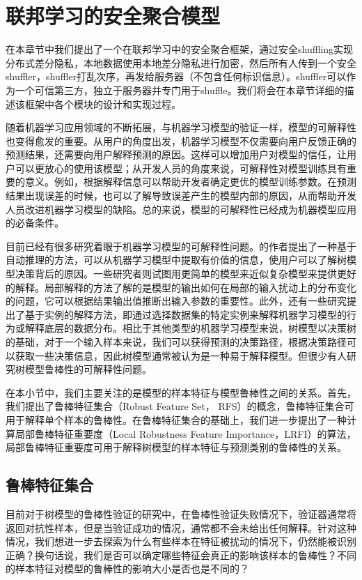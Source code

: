 \chapter{联邦学习的安全聚合模型}
\label{ch4}
在本章节中我们提出了一个在联邦学习中的安全聚合框架，通过安全shuffling实现分布式差分隐私，本地数据使用本地差分隐私进行加密，然后所有人传到一个安全shuffler，shuffler打乱次序，再发给服务器（不包含任何标识信息）。shuffler可以作为一个可信第三方，独立于服务器并专门用于shuffle。我们将会在本章节详细的描述该框架中各个模块的设计和实现过程。




随着机器学习应用领域的不断拓展，与机器学习模型的验证一样，模型的可解释性也变得愈发的重要。从用户的角度出发，机器学习模型不仅需要向用户反馈正确的预测结果，还需要向用户解释预测的原因。这样可以增加用户对模型的信任，让用户可以更放心的使用该模型；从开发人员的角度来说，可解释性对模型训练具有重要的意义。例如，根据解释信息可以帮助开发者确定更优的模型训练参数。在预测结果出现误差的时候，也可以了解导致误差产生的模型内部的原因，从而帮助开发人员改进机器学习模型的缺陷。总的来说，模型的可解释性已经成为机器模型应用的必备条件。

目前已经有很多研究着眼于机器学习模型的可解释性问题。\cite{bride2018towards}的作者提出了一种基于自动推理的方法，可以从机器学习模型中提取有价值的信息，使用户可以了解树模型决策背后的原因。一些研究者\cite{chu2018exact,zilke2016deepred}则试图用更简单的模型来近似复杂模型来提供更好的解释。局部解释的方法\cite{lundberg2017unified,ribeiro2018anchors}了解的是模型的输出如何在局部的输入扰动上的分布变化的问题，它可以根据结果输出值推断出输入参数的重要性。此外，还有一些研究提出了基于实例的解释方法\cite{kim2016examples,wachter2017counterfactual}，即通过选择数据集的特定实例来解释机器学习模型的行为或解释底层的数据分布。相比于其他类型的机器学习模型来说，树模型以决策树的基础，对于一个输入样本来说，我们可以获得预测的决策路径，根据决策路径可以获取一些决策信息，因此树模型通常被认为是一种易于解释模型。但很少有人研究树模型鲁棒性的可解释性问题。

在本小节中，我们主要关注的是模型的样本特征与模型鲁棒性之间的关系。首先，我们提出了鲁棒特征集合（Robust Feature Set， RFS）的概念，鲁棒特征集合可用于解释单个样本的鲁棒性。在鲁棒特征集合的基础上，我们进一步提出了一种计算局部鲁棒特征重要度（Local Robustness Feature Importance，LRFI）的算法，局部鲁棒特征重要度可用于解释树模型的样本特征与预测类别的鲁棒性的关系。

\section{鲁棒特征集合}
目前对于树模型的鲁棒性验证的研究中，在鲁棒性验证失败情况下，验证器通常将返回对抗性样本，但是当验证成功的情况，通常都不会未给出任何解释。针对这种情况，我们想进一步去探索为什么有些样本在特征被扰动的情况下，仍然能被识别正确？换句话说，我们是否可以确定哪些特征会真正的影响该样本的鲁棒性？不同的样本特征对模型的鲁棒性的影响大小是否也是不同的？

